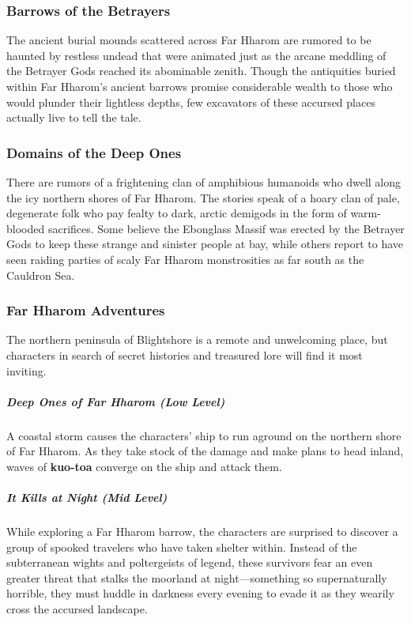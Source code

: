 \documentclass[10pt,a4paper,twoside,bg=print,twocolumn,openany,nodeprecatedcode]{dndbook}
\begin{document}
\subsubsection{Barrows of the Betrayers}
The ancient burial mounds scattered across Far Hharom are rumored to be haunted by restless undead that were animated just as the arcane meddling of the Betrayer Gods reached its abominable zenith. Though the antiquities buried within Far Hharom's ancient barrows promise considerable wealth to those who would plunder their lightless depths, few excavators of these accursed places actually live to tell the tale.

\subsubsection{Domains of the Deep Ones}
There are rumors of a frightening clan of amphibious humanoids who dwell along the icy northern shores of Far Hharom. The stories speak of a hoary clan of pale, degenerate folk who pay fealty to dark, arctic demigods in the form of warm-blooded sacrifices. Some believe the Ebonglass Massif was erected by the Betrayer Gods to keep these strange and sinister people at bay, while others report to have seen raiding parties of scaly Far Hharom monstrosities as far south as the Cauldron Sea.

\subsubsection{Far Hharom Adventures}
The northern peninsula of Blightshore is a remote and unwelcoming place, but characters in search of secret histories and treasured lore will find it most inviting.

\subparagraph{Deep Ones of Far Hharom (Low Level)}
A coastal storm causes the characters' ship to run aground on the northern shore of Far Hharom. As they take stock of the damage and make plans to head inland, waves of \textbf{kuo-toa} converge on the ship and attack them.

\subparagraph{It Kills at Night (Mid Level)}
While exploring a Far Hharom barrow, the characters are surprised to discover a group of spooked travelers who have taken shelter within. Instead of the subterranean wights and poltergeists of legend, these survivors fear an even greater threat that stalks the moorland at night—something so supernaturally horrible, they must huddle in darkness every evening to evade it as they wearily cross the accursed landscape.
\end{document}
